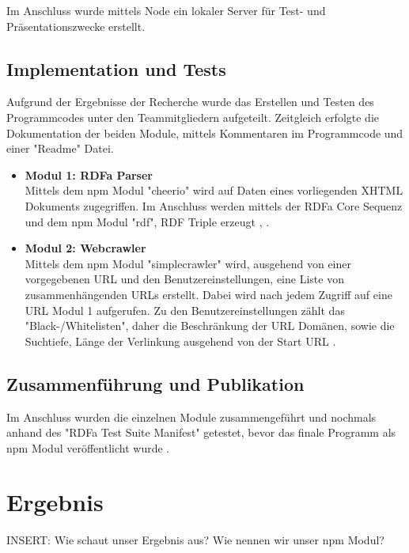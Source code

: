 \documentclass[hidelinks, a4paper, 11pt]{article} %
\begin{document}
Im Anschluss wurde mittels Node ein lokaler Server f\"ur Test- und Pr\"asentationszwecke erstellt.

\subsection{Implementation und Tests}

Aufgrund der Ergebnisse der Recherche wurde das Erstellen und Testen des Programmcodes unter den Teammitgliedern aufgeteilt. Zeitgleich erfolgte die Dokumentation der beiden Module, mittels Kommentaren im Programmcode und einer "Readme" Datei. 

\begin{itemize}
\item \textbf{Modul 1: RDFa Parser} \\
Mittels dem npm Modul "cheerio" wird auf Daten eines vorliegenden XHTML Dokuments zugegriffen. Im Anschluss werden mittels der RDFa Core Sequenz und dem npm Modul "rdf", RDF Triple erzeugt \cite{cheerioModule}, \cite{rdfModule}. 

\item \textbf{Modul 2: Webcrawler} \\
Mittels dem npm Modul "simplecrawler" wird, ausgehend von einer vorgegebenen URL und den Benutzereinstellungen, eine Liste von zusammenh\"angenden URLs erstellt. Dabei wird nach jedem Zugriff auf eine URL Modul 1 aufgerufen. Zu den Benutzereinstellungen z\"ahlt das "Black-/Whitelisten", daher die Beschr\"ankung der URL Dom\"anen, sowie die Suchtiefe, L\"ange der Verlinkung ausgehend von der Start URL \cite{simplecrawlerModule}.
\end{itemize}

\subsection{Zusammenf\"uhrung und Publikation}

Im Anschluss wurden die einzelnen Module zusammengef\"uhrt und nochmals anhand des "RDFa Test Suite Manifest" getestet, bevor das finale Programm als npm Modul ver\"offentlicht wurde \cite{rdfaTest}.



\section{Ergebnis}

INSERT: Wie schaut unser Ergebnis aus? Wie nennen wir unser npm Modul?
\end{document}
